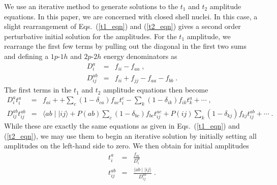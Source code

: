 We use an iterative method to generate 
solutions to the $t_1$ and $t_2$ amplitude equations. In this paper,
we are concerned with closed shell nuclei. In this case, a slight 
rearrangement of Eqs.~(\ref{t1_eqn}) and (\ref{t2_eqn}) gives a second
order perturbative initial solution for the amplitudes. For the 
$t_1$ amplitude, we rearrange the first few terms by pulling out the
diagonal in the first two sums and defining a $1p$-$1h$ and $2p$-$2h$ 
energy denominators as
\begin{eqnarray}
D^a_i & = & f_{ii}-f_{aa} \;, \\
D^{ab}_{ij} & = & f_{ii}+f_{jj}-f_{aa}-f_{bb} \;.
\end{eqnarray}
The first terms in the $t_1$ and $t_2$ amplitude equations then become
\begin{eqnarray}
D^a_i t^a_i & = & f_{ai} + 
+ \sum_c (1-\delta_{ca})f_{ac}t^c_i - \sum_k (1-\delta_{ik})f_{ik}t^a_k 
+\cdots \;, \\
D^{ab}_{ij}t^{ab}_{ij} & = & \langle ab\mid\mid ij \rangle +
P(ab)\sum_c(1-\delta_{bc})f_{bc}t^{ac}_{ij}+
P(ij)\sum_k(1-\delta_{kj}) f_{kj}t^{ab}_{ij}+\cdots\;.
\end{eqnarray}
While these are exactly the same equations as given in 
Eqs.~(\ref{t1_eqn}) and (\ref{t2_eqn}),
we may use them to begin an iterative solution by 
initially setting all amplitudes on the left-hand side to zero. We
then obtain for initial amplitudes 
\begin{eqnarray}
t^a_i &=& \frac{f_{ai}}{D^a_i} \\
t^{ab}_{ij} &=& \frac{\langle ab \mid\mid ij \rangle}{D^{ab}_{ij}}\;. 
\label{amp_start}
\end{eqnarray}

